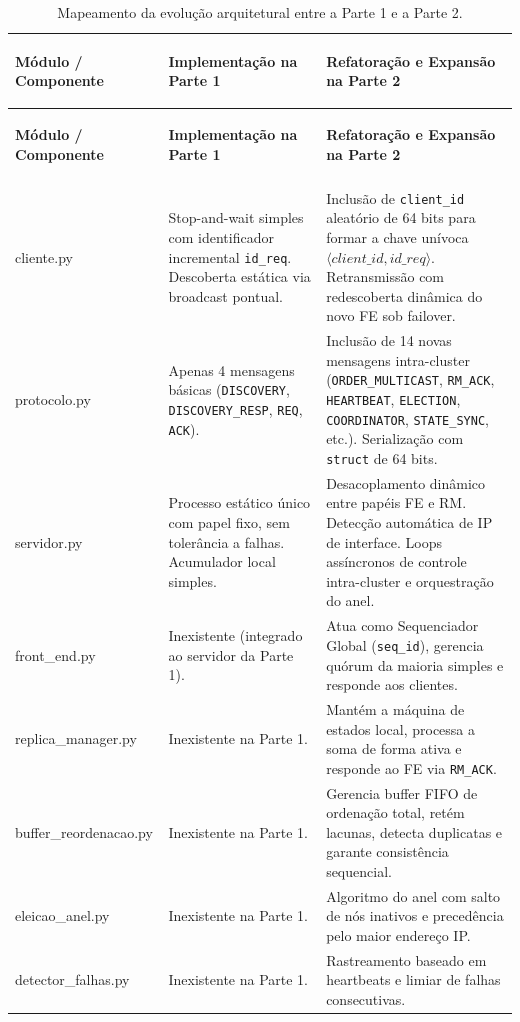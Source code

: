 \documentclass[12pt,a4paper]{article}
\newcommand{\arquivo}[1]{\texttt{#1}}
\newcommand{\mensagem}[1]{\texttt{#1}}
\begin{document}
\begin{small}
\begin{longtable}{>{\bfseries\raggedright\arraybackslash}p{3.4cm} >{\raggedright\arraybackslash}p{5.3cm} >{\raggedright\arraybackslash}p{5.3cm}}
    \caption{Mapeamento da evolução arquitetural entre a Parte 1 e a Parte 2.}
    \label{tab:refatoracao} \\
    \toprule
    \textbf{Módulo / Componente} & \textbf{Implementação na Parte 1} & \textbf{Refatoração e Expansão na Parte 2} \\
    \midrule
    \endfirsthead
    \toprule
    \textbf{Módulo / Componente} & \textbf{Implementação na Parte 1} & \textbf{Refatoração e Expansão na Parte 2} \\
    \midrule
    \endhead
    \midrule
    \multicolumn{3}{r}{\footnotesize\textit{continua na próxima página}} \\
    \endfoot
    \bottomrule
    \endlastfoot

    cliente.py & Stop-and-wait simples com identificador incremental \arquivo{id\_req}. Descoberta estática via broadcast pontual. & Inclusão de \arquivo{client\_id} aleatório de 64 bits para formar a chave unívoca $\langle client\_id, id\_req \rangle$. Retransmissão com redescoberta dinâmica do novo FE sob failover. \\
    \addlinespace
    protocolo.py & Apenas 4 mensagens básicas (\mensagem{DISCOVERY}, \mensagem{DISCOVERY\_RESP}, \mensagem{REQ}, \mensagem{ACK}). & Inclusão de 14 novas mensagens intra-cluster (\mensagem{ORDER\_MULTICAST}, \mensagem{RM\_ACK}, \mensagem{HEARTBEAT}, \mensagem{ELECTION}, \mensagem{COORDINATOR}, \mensagem{STATE\_SYNC}, etc.). Serialização com \arquivo{struct} de 64 bits. \\
    \addlinespace
    servidor.py & Processo estático único com papel fixo, sem tolerância a falhas. Acumulador local simples. & Desacoplamento dinâmico entre papéis FE e RM. Detecção automática de IP de interface. Loops assíncronos de controle intra-cluster e orquestração do anel. \\
    \addlinespace
    front\_end.py & Inexistente (integrado ao servidor da Parte 1). & Atua como Sequenciador Global (\arquivo{seq\_id}), gerencia quórum da maioria simples e responde aos clientes. \\
    \addlinespace
    replica\_\allowbreak manager.py & Inexistente na Parte 1. & Mantém a máquina de estados local, processa a soma de forma ativa e responde ao FE via \mensagem{RM\_ACK}. \\
    \addlinespace
    buffer\_\allowbreak reordenacao.py & Inexistente na Parte 1. & Gerencia buffer FIFO de ordenação total, retém lacunas, detecta duplicatas e garante consistência sequencial. \\
    \addlinespace
    eleicao\_anel.py & Inexistente na Parte 1. & Algoritmo do anel com salto de nós inativos e precedência pelo maior endereço IP. \\
    \addlinespace
    detector\_\allowbreak falhas.py & Inexistente na Parte 1. & Rastreamento baseado em heartbeats e limiar de falhas consecutivas. \\
\end{longtable}
\end{small}
\end{document}
